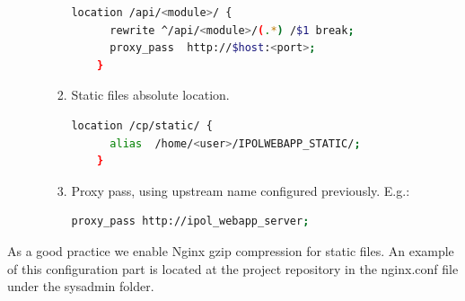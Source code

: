 \documentclass[a4paper,12pt]{article}
\begin{document}
\begin{enumerate}
\begin{enumerate}
\begin{enumerate}
    \begin{lstlisting}[language=Bash]
    location /api/<module>/ {
      rewrite ^/api/<module>/(.*) /$1 break;
      proxy_pass  http://$host:<port>;
    }
    \end{lstlisting}
    \item Static files absolute location.
    \begin{lstlisting}[language=Bash]
    location /cp/static/ {
      alias  /home/<user>/IPOLWEBAPP_STATIC/;
    }
    \end{lstlisting}
    \item Proxy pass, using upstream name configured previously.
    E.g.:
    \begin{lstlisting}[language=Bash]
    proxy_pass http://ipol_webapp_server;
    \end{lstlisting}

    \end{enumerate}
    \end{enumerate}
\end{enumerate}

As a good practice we enable Nginx gzip compression for static files. An example of this configuration part is located at the project repository 
in the nginx.conf file under the sysadmin folder.
\end{document}
